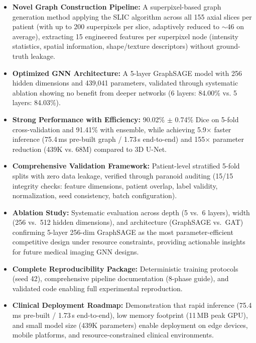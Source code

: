 \documentclass{article}
\begin{document}
\begin{itemize}

    \item \textbf{Novel Graph Construction Pipeline:} A superpixel-based graph generation method applying the SLIC algorithm \cite{achanta2012slic} across all 155 axial slices per patient (with up to 200 superpixels per slice, adaptively reduced to $\sim$46 on average), extracting 15 engineered features per superpixel node (intensity statistics, spatial information, shape/texture descriptors) without ground-truth leakage.

    \item \textbf{Optimized GNN Architecture:} A 5-layer GraphSAGE \cite{hamilton2017graphsage} model with 256 hidden dimensions and 439,041 parameters, validated through systematic ablation showing no benefit from deeper networks (6 layers: 84.00\% vs. 5 layers: 84.03\%).
    
    \item \textbf{Strong Performance with Efficiency:} 90.02\% $\pm$ 0.74\% Dice on 5-fold cross-validation and 91.41\% with ensemble, while achieving 5.9$\times$ faster inference (75.4\,ms pre-built graph / 1.73\,s end-to-end) and 155$\times$ parameter reduction (439K vs. 68M) compared to 3D U-Net.
    
    \item \textbf{Comprehensive Validation Framework:} Patient-level stratified 5-fold splits with zero data leakage, verified through paranoid auditing (15/15 integrity checks: feature dimensions, patient overlap, label validity, normalization, seed consistency, batch configuration).
    
    \item \textbf{Ablation Study:} Systematic evaluation across depth (5 vs.\ 6 layers), width (256 vs.\ 512 hidden dimensions), and architecture (GraphSAGE vs.\ GAT) confirming 5-layer 256-dim GraphSAGE as the most parameter-efficient competitive design under resource constraints, providing actionable insights for future medical imaging GNN designs.

    \item \textbf{Complete Reproducibility Package:} Deterministic training protocols (seed 42), comprehensive pipeline documentation (8-phase guide), and validated code enabling full experimental reproduction.
    
    \item \textbf{Clinical Deployment Roadmap:} Demonstration that rapid inference (75.4\,ms pre-built / 1.73\,s end-to-end), low memory footprint (11\,MB peak GPU), and small model size (439K parameters) enable deployment on edge devices, mobile platforms, and resource-constrained clinical environments.
\end{itemize}
\end{document}
